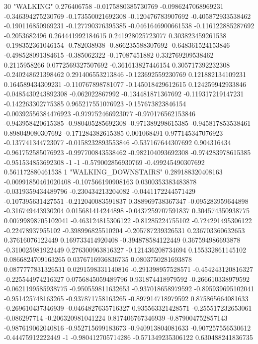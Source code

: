 30 "WALKING" 0.276406758 -0.0175880385730769 -0.0986247068969231 -0.346394275230769 -0.173550021692308 -0.120476783907692 -0.405872933538462 -0.190116850969231 -0.127790376395385 -0.0461646900661538 -0.116122885287692 -0.2053682496 0.264441992184615 0.241928025723077 0.303823459261538 -0.198352361046154 -0.782038938 -0.866235588307692 -0.648361524153846 -0.498528091384615 -0.385062322 -0.17087451882 0.332769209538462 0.2115958266 0.0772569327507692 -0.361613827446154 0.305717392232308 -0.240248621398462 0.291406553213846 -0.123692559230769 0.121882134109231 0.164589434309231 -0.110767898781077 -0.145018429612615 0.124259942933846 -0.0485430243892308 -0.062022867992 -0.134481871367692 -0.119317219147231 -0.142263302775385 0.965217551076923 -0.157673823846154 -0.00392556384476923 -0.979752466923077 -0.970176562153846 -0.943958420615385 -0.980405285692308 -0.971389298615385 -0.945817853538461 0.898049080307692 -0.171284382615385 0.001068491 0.977145347076923 -0.137741344723077 -0.0158232893553846 -0.537167644307692 0.904316434 -0.961752585076923 -0.997700843538462 -0.982104093692308 -0.974283978615385 -0.951534853692308 -1 -1 -0.579002856930769 -0.499245490307692 0.561172880461538
1 "WALKING_DOWNSTAIRS" 0.289188320408163 -0.00991850461020408 -0.107566190908163 0.0300353383483878 -0.0319359434489796 -0.230434213204082 -0.0441172244571429 -0.107395631427551 -0.212040083591837 0.388969738367347 -0.095283959644898 -0.316749443930204 0.015681414244898 -0.0437259707591837 0.304574350938775 0.00799898705102041 -0.463124815306122 -0.81285224755102 -0.724291495306122 -0.22478937955102 -0.398996825510204 -0.205787239326531 0.236703360632653 0.37616076122449 0.169733414920408 -0.394878584122449 0.367594986693878 -0.310025981922449 0.276300963816327 -0.121436208734694 0.155332861145102 0.0866824709163265 0.0376716936836735 0.0803750281693878 0.0877777831326531 0.0291598331140816 -0.291398957528571 -0.454243120816327 -0.225544974216327 0.0756845059489796 0.931874418979592 -0.266610338979592 -0.0621199585938775 -0.950559811632653 -0.937018658979592 -0.895939695102041 -0.951425748163265 -0.937871758163265 -0.897914718979592 0.875865664081633 -0.269610437346939 -0.0464827635716327 0.935563321428571 -0.255517232653061 -0.086297714 -0.206320981041224 0.817406767346939 -0.879004752857143 -0.987619062040816 -0.952715699183673 -0.940913804081633 -0.907257556530612 -0.44475912222449 -1 -0.980412705714286 -0.571349235306122 0.630488241836735
